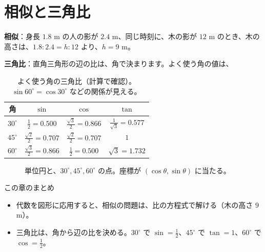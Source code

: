 \documentclass[a4paper,11pt,openany]{ltjsbook}
\begin{document}
\section{相似と三角比}

\textbf{相似}：身長 $1.8$ m の人の影が $2.4$ m、同じ時刻に、木の影が $12$ m のとき、木の高さは、$1.8:2.4=h:12$ より、$h=9$ m。

\textbf{三角比}：直角三角形の辺の比は、角で決まります。よく使う角の値は、

\begin{table}[htbp]
\centering
\begin{tabular}{c|ccc}
\toprule
角 & $\sin$ & $\cos$ & $\tan$\\
\midrule
$30^\circ$ & $\tfrac12=0.500$ & $\tfrac{\sqrt3}2=0.866$ & $\tfrac1{\sqrt3}=0.577$\\
$45^\circ$ & $\tfrac{\sqrt2}2=0.707$ & $\tfrac{\sqrt2}2=0.707$ & $1$\\
$60^\circ$ & $\tfrac{\sqrt3}2=0.866$ & $\tfrac12=0.500$ & $\sqrt3=1.732$\\
\bottomrule
\end{tabular}
\caption{よく使う角の三角比（計算で確認）。$\sin60^\circ=\cos30^\circ$ などの関係が見える。}
\end{table}

\begin{figure}[htbp]
\centering
{}
\caption{単位円と、$30^\circ,45^\circ,60^\circ$ の点。座標が $(\cos\theta,\sin\theta)$ に当たる。}
\end{figure}

\begin{pointbox}{この章のまとめ}
\begin{itemize}[leftmargin=*]
\item 代数を図形に応用すると、相似の問題は、比の方程式で解ける（木の高さ $9$ m）。
\item 三角比は、角から辺の比を決める。$30^\circ$ で $\sin=\tfrac12$、$45^\circ$ で $\tan=1$、$60^\circ$ で $\cos=\tfrac12$。
\end{itemize}
\end{pointbox}
\end{document}
